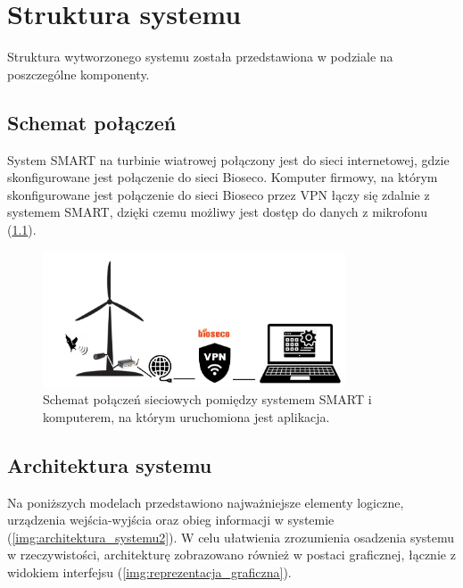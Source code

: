 \documentclass{sprz}
\begin{document}
\chapter{Struktura systemu}

Struktura wytworzonego systemu została przedstawiona w podziale na poszczególne komponenty.

\section{Schemat połączeń}
System SMART na turbinie wiatrowej połączony jest do sieci internetowej, gdzie skonfigurowane jest połączenie do sieci Bioseco. Komputer firmowy, na którym skonfigurowane jest połączenie do sieci Bioseco przez VPN łączy się zdalnie z systemem SMART, dzięki czemu możliwy jest dostęp do danych z mikrofonu (\ref{img:system-connection}).

\begin{figure}[h] 
  \centering
  \includegraphics[width=0.8\textwidth]{sprz/system-connection.png}
  \caption{Schemat połączeń sieciowych pomiędzy systemem SMART i komputerem, na którym uruchomiona jest aplikacja.}
  \label{img:system-connection}
\end{figure} 


\section{Architektura systemu}

Na poniższych modelach przedstawiono najważniejsze elementy logiczne, urządzenia wejścia-wyjścia oraz obieg informacji w systemie (\ref{img:architektura_systemu2}). W celu ułatwienia zrozumienia osadzenia systemu w rzeczywistości, architekturę zobrazowano również w postaci graficznej, łącznie z widokiem interfejsu (\ref{img:reprezentacja_graficzna}). 
\end{document}
